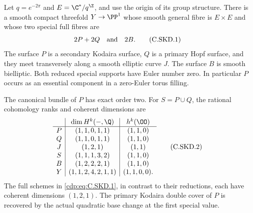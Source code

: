 
\begin{proposition}\label{cdp:st:C.2.UN.21}
Let $q=e^{-2\pi}$ and $E=\C^*/q^{\Z}$, and use the
origin of its group structure. There is a smooth compact
threefold $Y\to\PP^1$ whose smooth general fibre is
$E\times E$ and whose two special full fibres are
\[
                        2P+2Q\quad\hbox{and}\quad 2B.
                                                            \tag{C.SKD.1}\label{cdp:eq:C.SKD.1}
\]
The surface $P$ is a secondary Kodaira surface, $Q$ is
a primary Hopf surface, and they meet transversely along
a smooth elliptic curve $J$. The surface $B$ is smooth
bielliptic. Both reduced special supports have Euler
number zero. In particular $P$ occurs as an essential
component in a zero-Euler torus filling.

The canonical bundle of $P$ has exact order two. For
$S=P\cup Q$, the rational cohomology ranks and coherent
dimensions are
\[
 \begin{array}{c|c|c}
 &\dim H^k(-,\Q)&h^k(\OO)\\ \hline
 P&(1,1,0,1,1)&(1,1,0)\\
 Q&(1,1,0,1,1)&(1,1,0)\\
 J&(1,2,1)&(1,1)\\
 S&(1,1,1,3,2)&(1,1,0)\\
 B&(1,2,2,2,1)&(1,1,0)\\
 Y&(1,1,2,4,2,1,1)&(1,1,0,0).
 \end{array}                                             \tag{C.SKD.2}\label{cdp:eq:C.SKD.2}
\]
The full schemes in \eqref{cdp:eq:C.SKD.1}, in contrast to their
reductions, each have coherent dimensions $(1,2,1)$.
The primary Kodaira double cover of $P$ is recovered
by the actual quadratic base change at the first
special value.
\end{proposition}
